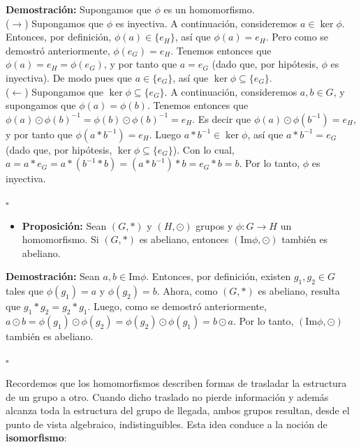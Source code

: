 \documentclass[10 pt]{article}
\begin{document}
\Large{\textbf{Demostración:} Supongamos que $\phi$ es un homomorfismo. \\

($\rightarrow$) Supongamos que $\phi$ es inyectiva. A continuación, consideremos $a \in \ker \phi$. Entonces, por definición, $\phi(a) \in \{e_H\}$, así que $\phi(a)=e_H$. Pero como se demostró anteriormente, $\phi(e_G)=e_H$. Tenemos entonces que $\phi(a)=e_H=\phi(e_G)$, y por tanto que $a=e_G$ (dado que, por hipótesis, $\phi$ es inyectiva). De modo pues que $a \in \{e_G\}$, así que $\ker \phi \subseteq \{e_G\}$. \\

($\leftarrow$) Supongamos que $\ker \phi \subseteq \{e_G\}$. A continuación, consideremos $a,b \in G$, y supongamos que $\phi(a)=\phi(b)$. Tenemos entonces que $\phi(a) \odot \phi(b)^{-1}=\phi(b) \odot \phi(b)^{-1}=e_H$. Es decir que $\phi(a)\odot\phi(b^{-1})=e_H$, y por tanto que $\phi(a*b^{-1})=e_H$. Luego $a*b^{-1} \in \ker \phi$, así que $a*b^{-1}=e_G$ (dado que, por hipótesis, $\ker \phi \subseteq \{e_G\}$). Con lo cual, $a=a*e_G=a*(b^{-1}*b)=(a*b^{-1})*b=e_G*b=b$. Por lo tanto, $\phi$ es inyectiva.} \\

\begin{flushright}
    $\square$
\end{flushright}

\begin{itemize}
    \item \Large{\textbf{Proposición:} Sean $(G,*)$ y $(H,\odot)$ grupos y $\phi:G \rightarrow H$ un homomorfismo. Si $(G,*)$ es abeliano, entonces $(\text{Im}\phi,\odot)$ también es abeliano.} \\
\end{itemize}

\Large{\textbf{Demostración:} Sean $a,b \in \text{Im} \phi$. Entonces, por definición, existen $g_1,g_2 \in G$ tales que $\phi(g_1)=a$ y $\phi(g_2)=b$. Ahora, como $(G,*)$ es abeliano, resulta que $g_1*g_2=g_2*g_1$. Luego, como se demostró anteriormente, $a\odot b=\phi(g_1) \odot \phi(g_2)=\phi(g_2) \odot \phi(g_1)=b\odot a$. Por lo tanto, $(\text{Im}\phi,\odot)$ también es abeliano.} \\

\begin{flushright}
    $\square$
\end{flushright}

\Large{Recordemos que los homomorfismos describen formas de trasladar la estructura de un grupo a otro. Cuando dicho traslado no pierde información y además alcanza toda la estructura del grupo de llegada, ambos grupos resultan, desde el punto de vista algebraico, indistinguibles. Esta idea conduce a la noción de \textbf{isomorfismo}:} \\
\end{document}
